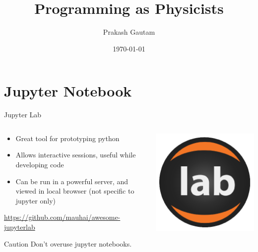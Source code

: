 \documentclass[aspectratio=169]{beamer}
\author{Prakash Gautam \\ \Nepali{[ प्रकाश गौतम ]}}
\title{Programming as Physicists}
\date{\today}
\begin{document}
\titlepage

\renewcommand{\bf}[1]{\textcolor{red!60}{#1}}

%
%
\section{Jupyter Notebook}
%
\begin{frame}{Jupyter Lab}
    \begin{columns}
        \begin{column}{0.49\textwidth}
            \begin{itemize}
                \item Great tool for prototyping python
                \item Allows interactive sessions, useful while developing code
                \item Can be run in a powerful server, and viewed in local browser (not specific to jupyter only)
            \end{itemize}
            \href{https://github.com/mauhai/awesome-jupyterlab}{\textcolor{green!40}{https://github.com/mauhai/awesome-jupyterlab}}
            \begin{block}{Caution}
                Don't overuse jupyter notebooks.
            \end{block}
        \end{column}
        \begin{column}{0.49\textwidth}
            \begin{center}
                \includegraphics[width=0.4\linewidth]{images/jupyter_logo.png}
            \end{center}
        \end{column}
    \end{columns}
\end{frame} 
\end{document}

